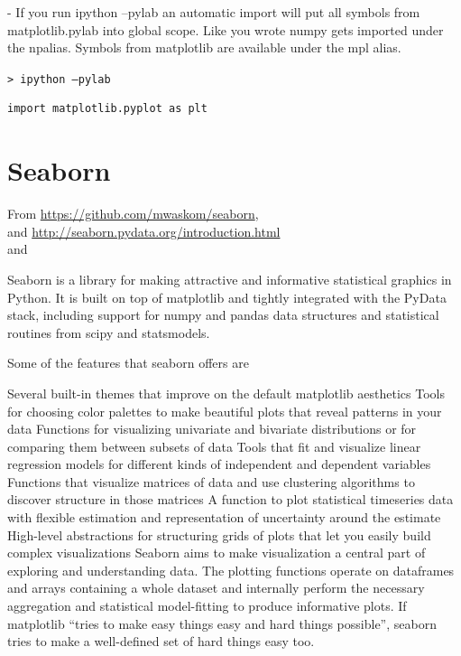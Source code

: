 \documentclass[11pt,a4paper]{article}
\begin{document}
- If you run ipython --pylab an automatic import will put all symbols
from matplotlib.pylab into global scope. Like you wrote numpy gets
imported under the npalias. Symbols from matplotlib are available
under the mpl alias.

{\tt > ipython --pylab}\\
\begin{lstlisting}
import matplotlib.pyplot as plt

\end{lstlisting}


\newpage
\section{Seaborn}
From \href{https://github.com/mwaskom/seaborn}{https://github.com/mwaskom/seaborn}, \\
and \href{http://seaborn.pydata.org/introduction.html}{http://seaborn.pydata.org/introduction.html}\\ 
and 

Seaborn is a library for making attractive and informative statistical graphics in Python. It is built on top of matplotlib and tightly integrated with the PyData stack, including support for numpy and pandas data structures and statistical routines from scipy and statsmodels.

Some of the features that seaborn offers are

Several built-in themes that improve on the default matplotlib aesthetics
Tools for choosing color palettes to make beautiful plots that reveal patterns in your data
Functions for visualizing univariate and bivariate distributions or for comparing them between subsets of data
Tools that fit and visualize linear regression models for different kinds of independent and dependent variables
Functions that visualize matrices of data and use clustering algorithms to discover structure in those matrices
A function to plot statistical timeseries data with flexible estimation and representation of uncertainty around the estimate
High-level abstractions for structuring grids of plots that let you easily build complex visualizations
Seaborn aims to make visualization a central part of exploring and understanding data. The plotting functions operate on dataframes and arrays containing a whole dataset and internally perform the necessary aggregation and statistical model-fitting to produce informative plots. If matplotlib “tries to make easy things easy and hard things possible”, seaborn tries to make a well-defined set of hard things easy too.
\end{document}
